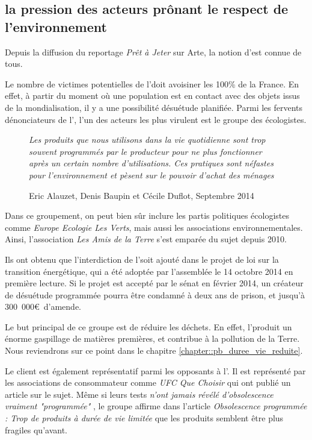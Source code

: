 \subsection{la pression des acteurs prônant le respect de l'environnement }

Depuis la diffusion du reportage \textit{Prêt à Jeter} sur Arte, la notion d'\op est connue de tous. 

Le nombre de victimes potentielles de l'\op doit avoisiner les 100\% de la France. En effet, à partir du moment où une population est en contact avec des objets issus de la mondialisation, il y a une possibilité désuétude planifiée. 
Parmi les fervents dénonciateurs de l'\op, l'un des acteurs les plus virulent est le groupe des écologistes. 

\begin{wrapfigure}{r}{0.3\textwidth}
\vspace{0.1cm}\og  \textit{Les produits que nous utilisons dans la vie quotidienne sont trop souvent programmés par le producteur pour ne plus fonctionner après un certain nombre d'utilisations. Ces pratiques sont néfastes pour l'environnement et pèsent sur le pouvoir d'achat des ménages} \fg{} \caption{Eric Alauzet, Denis Baupin et Cécile Duflot, Septembre 2014}
\end{wrapfigure}

Dans ce groupement, on peut bien sûr inclure les partis politiques écologistes  comme \textit{Europe Ecologie Les Verts}, mais aussi les associations environnementales. Ainsi, l'association \textit{Les Amis de la Terre} s'est emparée du sujet depuis 2010. 

Ils ont obtenu que l'interdiction de l'\op soit ajouté dans le projet de loi sur la transition énergétique, qui a été adoptée par l'assemblée le 14 octobre 2014 en première lecture. Si le projet est accepté par le sénat en février 2014, un créateur de désuétude programmée pourra être condamné à deux ans de prison, et jusqu'à 300~000\euro~d'amende. 

Le but principal de ce groupe est de réduire les déchets. En effet, l'\op produit un énorme gaspillage de matières premières, et contribue à la pollution de la Terre. Nous reviendrons sur ce point dans le chapitre \ref{chapter::pb_duree_vie_reduite}.

\medbreak
Le client est également représentatif parmi les opposants à l'\op. Il est  représenté par les associations de consommateur comme \textit{UFC Que Choisir} qui ont publié un article \cite{ufc_OP} sur le sujet. Même si leurs tests \og \textit{n'ont jamais révélé d’obsolescence vraiment "programmée" }  \fg{}  , le groupe affirme dans l'article \textit{Obsolescence programmée : Trop de produits à durée de vie limitée } que les produits semblent être plus fragiles qu'avant.


